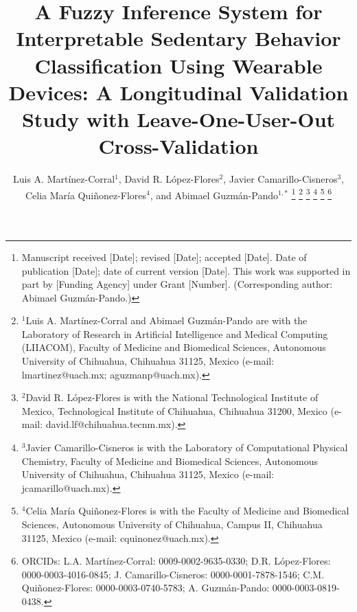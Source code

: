 \documentclass[journal,twoside,web]{ieeecolor}
\begin{document}
\title{A Fuzzy Inference System for Interpretable Sedentary Behavior Classification Using Wearable Devices: A Longitudinal Validation Study with Leave-One-User-Out Cross-Validation}

\author{Luis A. Martínez-Corral$^{1}$, 
David R. López-Flores$^{2}$, 
Javier Camarillo-Cisneros$^{3}$, 
Celia María Quiñonez-Flores$^{4}$, 
and Abimael Guzmán-Pando$^{1,*}$
\thanks{Manuscript received [Date]; revised [Date]; accepted [Date]. Date of publication [Date]; date of current version [Date]. This work was supported in part by [Funding Agency] under Grant [Number]. (Corresponding author: Abimael Guzmán-Pando.)}
\thanks{$^{1}$Luis A. Martínez-Corral and Abimael Guzmán-Pando are with the Laboratory of Research in Artificial Intelligence and Medical Computing (LIIACOM), Faculty of Medicine and Biomedical Sciences, Autonomous University of Chihuahua, Chihuahua 31125, Mexico (e-mail: lmartinez@uach.mx; aguzmanp@uach.mx).}
\thanks{$^{2}$David R. López-Flores is with the National Technological Institute of Mexico, Technological Institute of Chihuahua, Chihuahua 31200, Mexico (e-mail: david.lf@chihuahua.tecnm.mx).}
\thanks{$^{3}$Javier Camarillo-Cisneros is with the Laboratory of Computational Physical Chemistry, Faculty of Medicine and Biomedical Sciences, Autonomous University of Chihuahua, Chihuahua 31125, Mexico (e-mail: jcamarillo@uach.mx).}
\thanks{$^{4}$Celia María Quiñonez-Flores is with the Faculty of Medicine and Biomedical Sciences, Autonomous University of Chihuahua, Campus II, Chihuahua 31125, Mexico (e-mail: cquinonez@uach.mx).}
\thanks{ORCIDs: L.A. Martínez-Corral: 0009-0002-9635-0330; D.R. López-Flores: 0000-0003-4016-0845; J. Camarillo-Cisneros: 0000-0001-7878-1546; C.M. Quiñonez-Flores: 0000-0003-0740-5783; A. Guzmán-Pando: 0000-0003-0819-0438.}}

\maketitle
\end{document}
